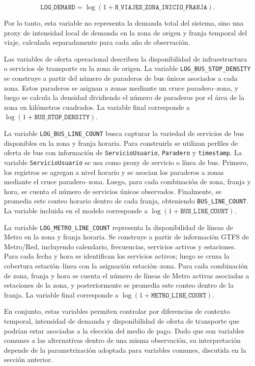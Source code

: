 \begin{equation}
    \texttt{LOG\_DEMAND}
    =
    \log(1 + \texttt{N\_VIAJES\_ZONA\_INICIO\_FRANJA}).
\end{equation}

Por lo tanto, esta variable no representa la demanda total del sistema, sino una proxy de intensidad local de demanda en la zona de origen y franja temporal del viaje, calculada separadamente para cada año de observación.

Las variables de oferta operacional describen la disponibilidad de infraestructura o servicios de transporte en la zona de origen. La variable \texttt{LOG\_BUS\_STOP\_DENSITY} se construye a partir del número de paraderos de bus únicos asociados a cada zona. Estos paraderos se asignan a zonas mediante un cruce paradero--zona, y luego se calcula la densidad dividiendo el número de paraderos por el área de la zona en kilómetros cuadrados. La variable final corresponde a \(\log(1+\texttt{BUS\_STOP\_DENSITY})\).

La variable \texttt{LOG\_BUS\_LINE\_COUNT} busca capturar la variedad de servicios de bus disponibles en la zona y franja horaria. Para construirla se utilizan perfiles de oferta de bus con información de \texttt{ServicioUsuario}, \texttt{Paradero} y \texttt{timestamp}. La variable \texttt{ServicioUsuario} se usa como proxy de servicio o línea de bus. Primero, los registros se agregan a nivel horario y se asocian los paraderos a zonas mediante el cruce paradero--zona. Luego, para cada combinación de zona, franja y hora, se cuenta el número de servicios únicos observados. Finalmente, se promedia este conteo horario dentro de cada franja, obteniendo \texttt{BUS\_LINE\_COUNT}. La variable incluida en el modelo corresponde a \(\log(1+\texttt{BUS\_LINE\_COUNT})\).

La variable \texttt{LOG\_METRO\_LINE\_COUNT} representa la disponibilidad de líneas de Metro en la zona y franja horaria. Se construye a partir de información GTFS de Metro/Red, incluyendo calendario, frecuencias, servicios activos y estaciones. Para cada fecha y hora se identifican los servicios activos; luego se cruza la cobertura estación--línea con la asignación estación--zona. Para cada combinación de zona, franja y hora se cuenta el número de líneas de Metro activas asociadas a estaciones de la zona, y posteriormente se promedia este conteo dentro de la franja. La variable final corresponde a \(\log(1+\texttt{METRO\_LINE\_COUNT})\).

En conjunto, estas variables permiten controlar por diferencias de contexto temporal, intensidad de demanda y disponibilidad de oferta de transporte que podrían estar asociadas a la elección del medio de pago. Dado que son variables comunes a las alternativas dentro de una misma observación, su interpretación depende de la parametrización adoptada para variables comunes, discutida en la sección anterior.

